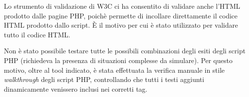 Lo strumento di validazione di W3C ci ha consentito di validare anche l’HTML prodotto dalle pagine PHP, poichè permette di incollare direttamente il codice HTML prodotto dallo script. È il motivo per cui è stato utilizzato per validare tutto il codice HTML. 

Non è stato possibile testare tutte le possibili combinazioni degli esiti degli script PHP (richiedeva la presenza di situazioni complesse da simulare). Per questo motivo, oltre al tool indicato, è stata effettuata la verifica manuale in stile \textit{walkthrough} degli script PHP, controllando che tutti i testi aggiunti dinamicamente venissero inclusi nei corretti tag.